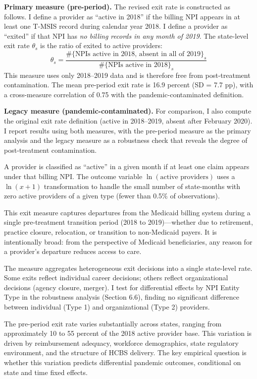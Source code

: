 \documentclass[12pt]{article}
\begin{document}
\textbf{Primary measure (pre-period).} The revised exit rate is constructed as follows. I define a provider as ``active in 2018'' if the billing NPI appears in at least one T-MSIS record during calendar year 2018. I define a provider as ``exited'' if that NPI has \textit{no billing records in any month of 2019}. The state-level exit rate $\theta_s$ is the ratio of exited to active providers:
\begin{equation}
\theta_s = \frac{\#\{\text{NPIs active in 2018, absent in all of 2019}\}_s}{\#\{\text{NPIs active in 2018}\}_s}
\label{eq:exit_rate}
\end{equation}
This measure uses only 2018--2019 data and is therefore free from post-treatment contamination. The mean pre-period exit rate is 16.9 percent (SD = 7.7 pp), with a cross-measure correlation of 0.75 with the pandemic-contaminated definition.

\textbf{Legacy measure (pandemic-contaminated).} For comparison, I also compute the original exit rate definition (active in 2018--2019, absent after February 2020). I report results using both measures, with the pre-period measure as the primary analysis and the legacy measure as a robustness check that reveals the degree of post-treatment contamination.

A provider is classified as ``active'' in a given month if at least one claim appears under that billing NPI. The outcome variable $\ln(\text{active providers})$ uses a $\ln(x+1)$ transformation to handle the small number of state-months with zero active providers of a given type (fewer than 0.5\% of observations).

This exit measure captures departures from the Medicaid billing system during a single pre-treatment transition period (2018 to 2019)---whether due to retirement, practice closure, relocation, or transition to non-Medicaid payers. It is intentionally broad: from the perspective of Medicaid beneficiaries, any reason for a provider's departure reduces access to care.

The measure aggregates heterogeneous exit decisions into a single state-level rate. Some exits reflect individual career decisions; others reflect organizational decisions (agency closure, merger). I test for differential effects by NPI Entity Type in the robustness analysis (Section 6.6), finding no significant difference between individual (Type 1) and organizational (Type 2) providers.

The pre-period exit rate varies substantially across states, ranging from approximately 10 to 55 percent of the 2018 active provider base. This variation is driven by reimbursement adequacy, workforce demographics, state regulatory environment, and the structure of HCBS delivery. The key empirical question is whether this variation predicts differential pandemic outcomes, conditional on state and time fixed effects.
\end{document}
